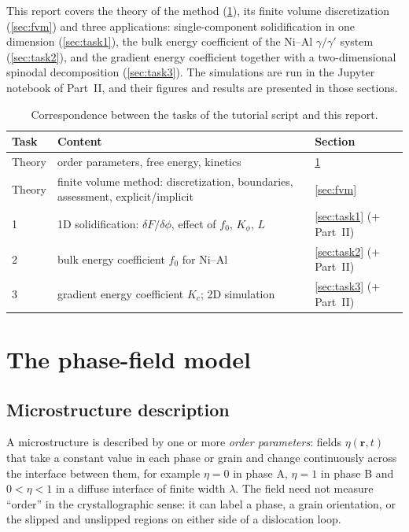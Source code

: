 \documentclass[11pt,a4paper]{article}
\numberwithin{equation}{section}
\theoremstyle{remark}
\begin{document}
This report covers the theory of the method (\cref{sec:model}), its finite volume discretization
(\cref{sec:fvm}) and three applications: single-component solidification in one dimension
(\cref{sec:task1}), the bulk energy coefficient of the Ni--Al $\gamma/\gamma'$ system
(\cref{sec:task2}), and the gradient energy coefficient together with a two-dimensional spinodal
decomposition (\cref{sec:task3}). The simulations are run in the Jupyter notebook of Part~II, and
their figures and results are presented in those sections.

\begin{table}[ht]
  \centering
  \caption{Correspondence between the tasks of the tutorial script and this report.}
  \label{tab:taskmap}
  \begin{tabularx}{0.9\linewidth}{lXl}
    \toprule
    Task & Content & Section \\
    \midrule
    Theory & order parameters, free energy, kinetics & \ref{sec:model} \\
    Theory & finite volume method: discretization, boundaries, assessment, explicit/implicit
           & \ref{sec:fvm} \\
    1 & 1D solidification: $\delta F/\delta\phi$, effect of $f_0$, $K_\phi$, $L$
      & \ref{sec:task1} (+ Part~II) \\
    2 & bulk energy coefficient $f_0$ for Ni--Al & \ref{sec:task2} (+ Part~II) \\
    3 & gradient energy coefficient $K_c$; 2D simulation & \ref{sec:task3} (+ Part~II) \\
    \bottomrule
  \end{tabularx}
\end{table}

\section{The phase-field model}\label{sec:model}

\subsection{Microstructure description}\label{sec:op}

A microstructure is described by one or more \emph{order parameters}: fields $\eta(\bm{r},t)$ that
take a constant value in each phase or grain and change continuously across the interface between
them, for example $\eta = 0$ in phase A, $\eta = 1$ in phase B and $0 < \eta < 1$ in a diffuse
interface of finite width $\lambda$. The field need not measure ``order'' in the crystallographic
sense: it can label a phase, a grain orientation, or the slipped and unslipped regions on either side
of a dislocation loop.
\end{document}
